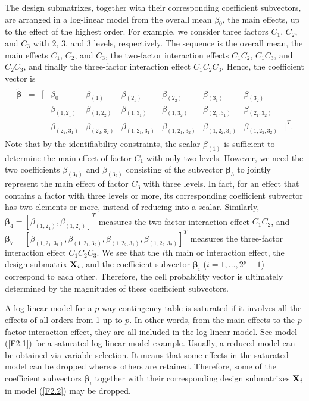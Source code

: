 The design submatrixes, together with their corresponding coefficient subvectors,
are arranged in a log-linear model from the overall mean $\beta_0$, the main
effects, up to the effect of the highest order. For example, we consider three
factors $C_1$, $C_2$, and $C_3$ with 2, 3, and 3 levels, respectively. The sequence
is the overall mean, the main effects $C_1$, $C_2$, and $C_3$, the two-factor
interaction effects $C_1C_2$, $C_1C_3$, and $C_2C_3$, and finally the three-factor
interaction effect $C_1C_2C_3$. Hence, the coefficient vector is
\begin{eqnarray}
\begin{array}{rrrlllllll}
\widetilde{\bm{\beta}} & = & [ & \beta_0 & \beta_{(1)} & \beta_{(2_1)} &
\beta_{(2_2)} & \beta_{(3_1)} & \beta_{(3_2)} & \\
& & & \beta_{(1,2_1)} & \beta_{(1,2_2)} & \beta_{(1,3_1)} & \beta_{(1,3_2)} &
\beta_{(2_1,3_1)} & \beta_{(2_1,3_2)} & \\
& & & \beta_{(2_2,3_1)} & \beta_{(2_2,3_2)} & \beta_{(1,2_1,3_1)} &
\beta_{(1,2_1,3_2)} & \beta_{(1,2_2,3_1)} & \beta_{(1,2_2,3_2)} & ]^T.
\end{array}\nonumber
\end{eqnarray}
Note that by the identifiability constraints, the scalar $\beta_{(1)}$ is sufficient
to determine the main effect of factor $C_1$ with only two levels. However, we need
the two coefficients $\beta_{(3_1)}$ and $\beta_{(3_2)}$ consisting of the subvector
$\bm\beta_3$ to jointly represent the main effect of factor $C_3$ with three levels.
In fact, for an effect that contains a factor with three levels or more, its
corresponding coefficient subvector has two elements or more, instead of reducing
into a scalar. Similarly, $\bm{\beta}_4=[\beta_{(1,2_1)},\beta_{(1,2_2)}]^T$
measures the two-factor interaction effect $C_1C_2$, and
$\bm{\beta}_7=[\beta_{(1,2_1,3_1)},
\beta_{(1,2_1,3_2)},\beta_{(1,2_2,3_1)},\beta_{(1,2_2,3_2)}]^T$ measures the
three-factor interaction effect $C_1C_2C_3$. We see that the $i$th main or
interaction effect, the design submatrix ${\bf X}_i$, and the coefficient subvector
$\bm{\beta}_i$ ($i=1,\ldots,2^p-1$) correspond to each other. Therefore, the cell
probability vector is ultimately determined by the magnitudes of these coefficient
subvectors.

A log-linear model for a $p$-way contingency table is saturated if it involves all
the effects of all orders from 1 up to $p$. In other words, from the main effects to
the $p$-factor interaction effect, they are all included in the log-linear model.
See model (\ref{F2.1}) for a saturated log-linear model example. Usually, a reduced
model can be obtained via variable selection. It means that some effects in the
saturated model can be dropped whereas others are retained. Therefore, some of the
coefficient subvectors $\bm\beta_i$ together with their corresponding design
submatrixes ${\bf X}_i$ in model (\ref{F2.2}) may be dropped.

